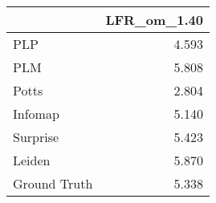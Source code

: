 \begin{tabular}{lr}
\toprule
{} & LFR_om_1.40 \\
\midrule
PLP          &       4.593 \\
PLM          &       5.808 \\
Potts        &       2.804 \\
Infomap      &       5.140 \\
Surprise     &       5.423 \\
Leiden       &       5.870 \\
Ground Truth &       5.338 \\
\bottomrule
\end{tabular}
